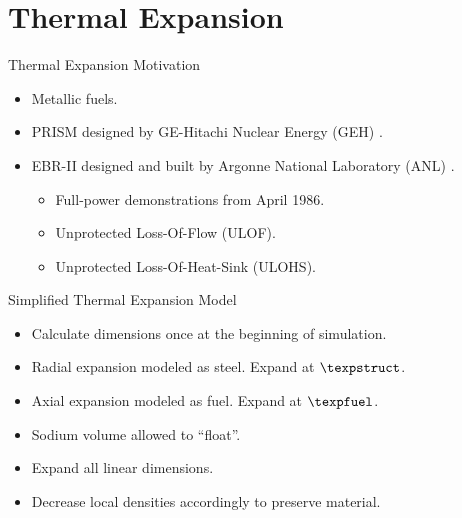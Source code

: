 \section{Thermal Expansion}
\label{sec:thermalExpansion}

\begin{frame}{Thermal Expansion Motivation}
  \begin{itemize}
    \item Metallic fuels.
    \item PRISM designed by GE-Hitachi Nuclear Energy (GEH) \cite{GEFR793}.
    \item EBR-II designed and built by Argonne National Laboratory (ANL)
      \cite{PlentifulEnergy}.
      \begin{itemize}
        \item Full-power demonstrations from April 1986.
        \item Unprotected Loss-Of-Flow (ULOF).
        \item Unprotected Loss-Of-Heat-Sink (ULOHS).
      \end{itemize}
  \end{itemize}
\end{frame}

\begin{frame}{Simplified Thermal Expansion Model}
  \begin{itemize}
    \item Calculate dimensions once at the beginning of simulation.
    \item Radial expansion modeled as steel. Expand at $\texpstruct$.
    \item Axial expansion modeled as fuel. Expand at $\texpfuel$.
    \item Sodium volume allowed to ``float''.
    \item Expand all linear dimensions.
    \item Decrease local densities accordingly to preserve material.
  \end{itemize}
\end{frame}

